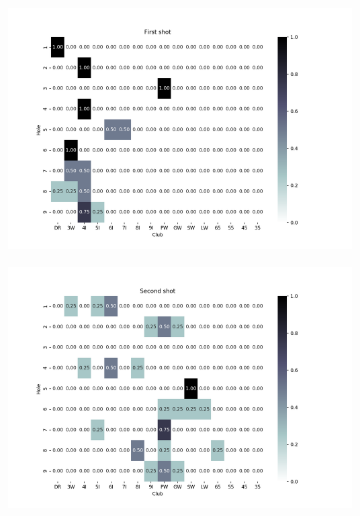 \documentclass{kththesis}
\begin{document}
\begin{figure}
    \centering
    \begin{subfigure}{\textwidth}
    \centering
    \includegraphics[height=0.3\textheight]{L2ClubChoices/Ludvig_Ullna_Club_Choices_First_Shot.png} 
    \end{subfigure}
    \begin{subfigure}{\textwidth}
    \centering
    \includegraphics[height=0.3\textheight]{L2ClubChoices/Ludvig_Ullna_Club_Choices_Second_Shot.png} 
    \end{subfigure}
    \begin{subfigure}{\textwidth}
    \centering

\end{subfigure}
\end{figure}
\end{document}
